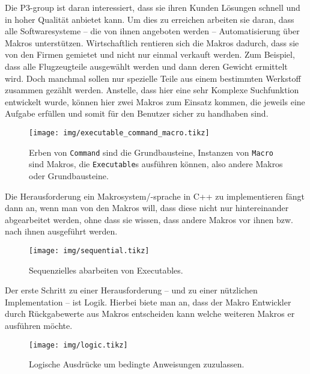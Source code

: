   Die P3-group ist daran interessiert, dass sie ihren Kunden Lösungen schnell und in hoher Qualität anbietet kann. Um dies zu erreichen arbeiten sie daran, dass alle Softwaresysteme -- die von ihnen angeboten werden -- Automatisierung über Makros unterstützen. Wirtschaftlich rentieren sich die Makros dadurch, dass sie von den Firmen gemietet und nicht nur einmal verkauft werden. Zum Beispiel, dass alle Flugzeugteile ausgewählt werden und dann deren Gewicht ermittelt wird. Doch manchmal sollen nur spezielle Teile aus einem bestimmten Werkstoff zusammen gezählt werden. Anstelle, dass hier eine sehr Komplexe Suchfunktion entwickelt wurde, können hier zwei Makros zum Einsatz kommen, die jeweils eine Aufgabe erfüllen und somit für den Benutzer sicher zu handhaben sind.


  \begin{figure}[H]
    \centering
    \texttt{[image: img/executable\_command\_macro.tikz]}
    \caption{Erben von \texttt{Command} sind die Grundbausteine, Instanzen von \texttt{Macro} sind Makros, die \texttt{Executable}s ausführen können, also andere Makros oder Grundbausteine.}
  \end{figure}

  Die Herausforderung ein Makrosystem/-sprache in C++ zu implementieren fängt dann an, wenn man von den Makros will, dass diese nicht nur hintereinander abgearbeitet werden, ohne dass sie wissen, dass andere Makros vor ihnen bzw. nach ihnen ausgeführt werden.

  \begin{figure}[H]
    \centering
    \texttt{[image: img/sequential.tikz]}
    \caption{Sequenzielles abarbeiten von Executables.}
  \end{figure}

  Der erste Schritt zu einer Herausforderung -- und zu einer nützlichen Implementation -- ist Logik. Hierbei biete man an, dass der Makro Entwickler durch Rückgabewerte aus Makros entscheiden kann welche weiteren Makros er ausführen möchte.

  \begin{figure}[H]
    \centering
    \texttt{[image: img/logic.tikz]}
    \caption{Logische Ausdrücke um bedingte Anweisungen zuzulassen.}
  \end{figure}

